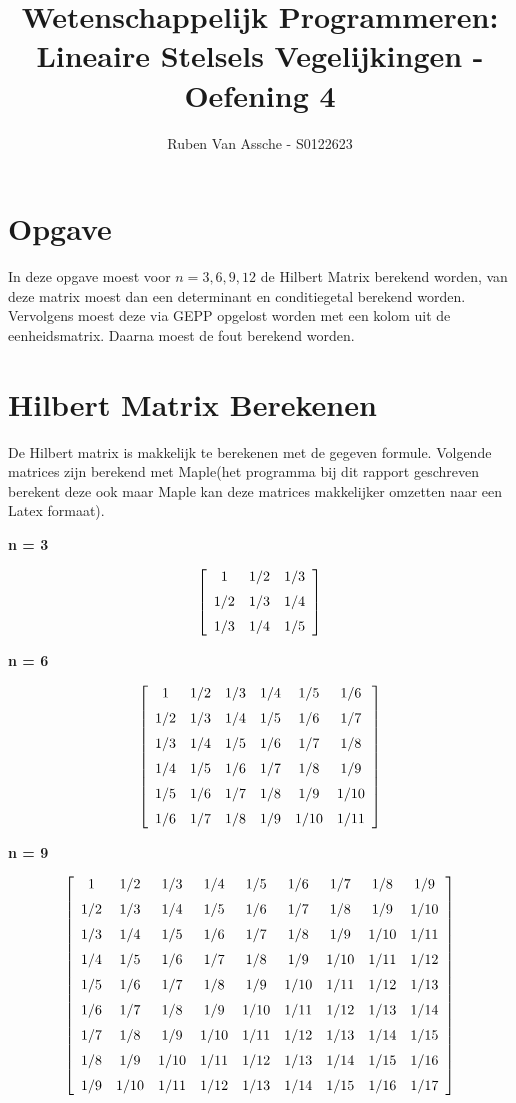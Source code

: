 \documentclass[10pt,a4paper]{article}
\author{Ruben Van Assche - S0122623}
\title{Wetenschappelijk Programmeren: Lineaire Stelsels Vegelijkingen - Oefening 4}
\begin{document}
\maketitle
\section{Opgave}
In deze opgave moest voor $n = 3, 6, 9, 12$ de Hilbert Matrix berekend worden, van deze matrix moest dan een determinant en conditiegetal berekend worden. Vervolgens moest deze via GEPP opgelost worden met een kolom uit de eenheidsmatrix. Daarna moest de fout berekend worden.

\section{Hilbert Matrix Berekenen}
De Hilbert matrix is makkelijk te berekenen met de gegeven formule. Volgende matrices zijn berekend met Maple(het programma bij dit rapport geschreven berekent deze ook maar Maple kan deze matrices makkelijker omzetten naar een Latex formaat).
\begin{center}
\textbf{n = 3}
\end{center}
$$ \left[ \begin {array}{ccc} 1&1/2&1/3\\ \noalign{\medskip}1/2&1/3&1/4
\\ \noalign{\medskip}1/3&1/4&1/5\end {array} \right] $$
\begin{center}
\textbf{n = 6}
\end{center}
$$  \left[ \begin {array}{cccccc} 1&1/2&1/3&1/4&1/5&1/6
\\ \noalign{\medskip}1/2&1/3&1/4&1/5&1/6&1/7\\ \noalign{\medskip}1/3&1
/4&1/5&1/6&1/7&1/8\\ \noalign{\medskip}1/4&1/5&1/6&1/7&1/8&1/9
\\ \noalign{\medskip}1/5&1/6&1/7&1/8&1/9&1/10\\ \noalign{\medskip}1/6&
1/7&1/8&1/9&1/10&1/11\end {array} \right] $$
\begin{center}
\textbf{n = 9}
\end{center}
$$  \left[ \begin {array}{ccccccccc} 1&1/2&1/3&1/4&1/5&1/6&1/7&1/8&1/9
\\ \noalign{\medskip}1/2&1/3&1/4&1/5&1/6&1/7&1/8&1/9&1/10
\\ \noalign{\medskip}1/3&1/4&1/5&1/6&1/7&1/8&1/9&1/10&1/11
\\ \noalign{\medskip}1/4&1/5&1/6&1/7&1/8&1/9&1/10&1/11&1/12
\\ \noalign{\medskip}1/5&1/6&1/7&1/8&1/9&1/10&1/11&1/12&1/13
\\ \noalign{\medskip}1/6&1/7&1/8&1/9&1/10&1/11&1/12&1/13&1/14
\\ \noalign{\medskip}1/7&1/8&1/9&1/10&1/11&1/12&1/13&1/14&1/15
\\ \noalign{\medskip}1/8&1/9&1/10&1/11&1/12&1/13&1/14&1/15&1/16
\\ \noalign{\medskip}1/9&1/10&1/11&1/12&1/13&1/14&1/15&1/16&1/17
\end {array} \right] 
 $$
\end{document}
